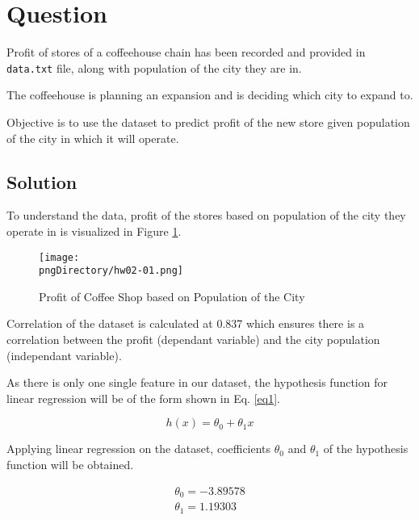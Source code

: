 \documentclass[12pt,letterpaper,twoside]{article}
\begin{document}

\makeHeader

\section*{Question}

Profit of stores of a coffeehouse chain has been recorded and provided in \texttt{data.txt} file, along with population of the city they are in.

The coffeehouse is planning an expansion and is deciding which city to expand to.

Objective is to use the dataset to predict profit of the new store given population of the city in which it will operate.

\subsection*{Solution}

To understand the data, profit of the stores based on population of the city they operate in is visualized in Figure \ref{fig1}.

\begin{figure}[H]\centering
\texttt{[image: \\pngDirectory/hw02-01.png]}
\caption{Profit of Coffee Shop based on Population of the City}\label{fig1}
\end{figure}

Correlation of the dataset is calculated at 0.837 which ensures there is a correlation between the profit (dependant variable) and the city population (independant variable).

As there is only one single feature in our dataset, the hypothesis function for linear regression will be of the form shown in Eq. \ref{eq1}.

\begin{equation}\label{eq1}
h(x) = \theta_0 + \theta_1 x
\end{equation}

Applying linear regression on the dataset, coefficients $\theta_0$ and $\theta_1$ of the hypothesis function will be obtained.

\begin{equation}\label{eq2}
\begin{split}
\theta_0 = -3.89578\\
\theta_1 = 1.19303
\end{split}
\end{equation}
\end{document}
